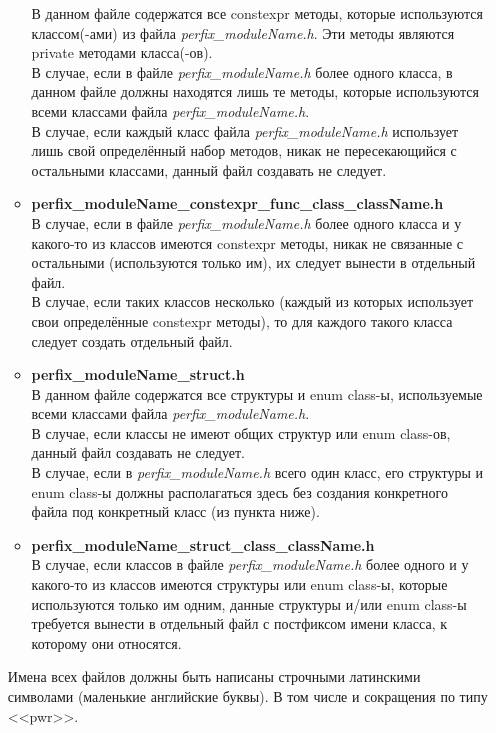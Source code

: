 \begin{enumerate}
\begin{itemize}
		В данном файле содержатся все constexpr методы, которые используются классом(-ами) из файла \textit{perfix\_moduleName.h}. Эти методы являются private методами класса(-ов).\\
		В случае, если в файле \textit{perfix\-\_module\-Name.h} более одного класса, в данном файле должны находятся лишь те методы, которые используются всеми классами файла \textit{perfix\-\_module\-Name.h}.\\
		В случае, если каждый класс файла \textit{perfix\_moduleName.h} использует лишь свой определённый набор методов, никак не пересекающийся с остальными классами, данный файл создавать не следует.
		\item \textbf{perfix\-\_moduleName\-\_constexpr\-\_func\-\_class\-\_class\-Name.h}\\
		В случае, если в файле \textit{perfix\_moduleName.h} более одного класса и у какого-то из классов имеются constexpr методы, никак не связанные с остальными (используются только им), их следует вынести в отдельный файл.\\
		В случае, если таких классов несколько (каждый из которых использует свои определённые constexpr методы), то для каждого такого класса следует создать отдельный файл.
		\item \textbf{perfix\_moduleName\_struct.h}\\		
		В данном файле содержатся все структуры и enum class-ы, используемые всеми классами файла \textit{perfix\_moduleName.h}.\\		
		В случае, если классы не имеют общих структур или enum class-ов, данный файл создавать не следует.\\		
		В случае, если в \textit{perfix\_moduleName.h} всего один класс, его структуры и enum class-ы должны располагаться здесь без создания конкретного файла под конкретный класс (из пункта ниже).
		\item \textbf{perfix\_moduleName\_struct\_class\_className.h}\\		
		В случае, если классов в файле \textit{perfix\_moduleName.h} более одного и у какого-то из классов имеются структуры или enum class-ы, которые используются только им одним, данные структуры и/или enum class-ы требуется вынести в отдельный файл с постфиксом имени класса, к которому они относятся.
	\end{itemize}

	Имена всех файлов должны быть написаны строчными латинскими символами (маленькие английские буквы). В том числе и сокращения по типу <<pwr>>.
	

\end{enumerate}

